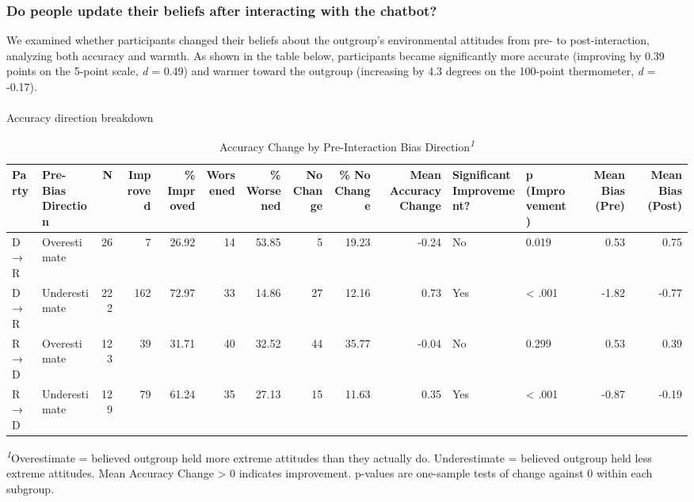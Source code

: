 \documentclass[
  11pt,
  oneside]{article}
\makeatletter
\let\oldparagraph\paragraph
\renewcommand{\paragraph}{
    \@ifstar
      \xxxParagraphStar
      \xxxParagraphNoStar
  }
\newcommand{\xxxParagraphStar}[1]{\oldparagraph*{#1}\mbox{}}
\newcommand{\xxxParagraphNoStar}[1]{\oldparagraph{#1}\mbox{}}
\makeatother
\begin{document}
\subsubsection{Do people update their beliefs after interacting with the
chatbot?}\label{do-people-update-their-beliefs-after-interacting-with-the-chatbot}

We examined whether participants changed their beliefs about the
outgroup's environmental attitudes from pre- to post-interaction,
analyzing both accuracy and warmth. As shown in the table below,
participants became significantly more accurate (improving by 0.39
points on the 5-point scale, \emph{d} = 0.49) and warmer toward the
outgroup (increasing by 4.3 degrees on the 100-point thermometer,
\emph{d} = -0.17).

\paragraph{Accuracy direction
breakdown}\label{accuracy-direction-breakdown}

\begin{table}
\caption*{
{\large Accuracy Change by Pre-Interaction Bias Direction\textsuperscript{\textit{1}}}
} 
\fontsize{12.0pt}{14.4pt}\selectfont
\begin{tabular*}{\linewidth}{@{\extracolsep{\fill}}llrrrrrrrrllrr}
\toprule
Party & Pre-Bias Direction & N & Improved & \% Improved & Worsened & \% Worsened & No Change & \% No Change & Mean Accuracy Change & Significant Improvement? & p (Improvement) & Mean Bias (Pre) & Mean Bias (Post) \\ 
\midrule\addlinespace[2.5pt]
D→R & Overestimate & 26 & 7 & 26.92 & 14 & 53.85 & 5 & 19.23 & -0.24 & No & 0.019 & 0.53 & 0.75 \\ 
D→R & Underestimate & 222 & 162 & 72.97 & 33 & 14.86 & 27 & 12.16 & 0.73 & Yes & < .001 & -1.82 & -0.77 \\ 
R→D & Overestimate & 123 & 39 & 31.71 & 40 & 32.52 & 44 & 35.77 & -0.04 & No & 0.299 & 0.53 & 0.39 \\ 
R→D & Underestimate & 129 & 79 & 61.24 & 35 & 27.13 & 15 & 11.63 & 0.35 & Yes & < .001 & -0.87 & -0.19 \\ 
\bottomrule
\end{tabular*}
\begin{minipage}{\linewidth}
\textsuperscript{\textit{1}}Overestimate = believed outgroup held more extreme attitudes than they actually do. Underestimate = believed outgroup held less extreme attitudes. Mean Accuracy Change > 0 indicates improvement. p-values are one-sample tests of change against 0 within each subgroup.\\
\end{minipage}
\end{table}
\end{document}
